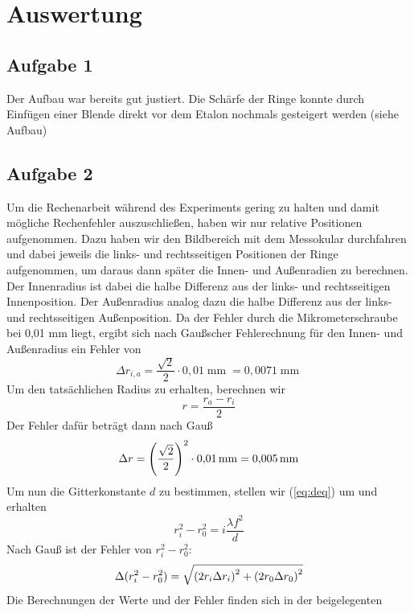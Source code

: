 \documentclass[a4paper,german,12pt,smallheadings]{scrartcl}
\begin{document}
\section{Auswertung}
\subsection{Aufgabe 1}
Der Aufbau war bereits gut justiert. Die Schärfe der Ringe konnte durch
Einfügen einer Blende direkt vor dem Etalon nochmals gesteigert werden (siehe
Aufbau)
\subsection{Aufgabe 2}
Um die Rechenarbeit während des Experiments gering zu halten und damit mögliche
Rechenfehler auszuschließen, haben wir nur relative Positionen aufgenommen.
Dazu haben wir den Bildbereich mit dem Messokular durchfahren und dabei jeweils
die links- und rechtsseitigen Positionen der Ringe aufgenommen, um daraus dann
später die Innen- und Außenradien zu berechnen.
Der Innenradius ist dabei die halbe Differenz aus der links- und rechtsseitigen
Innenposition. Der Außenradius analog dazu die halbe Differenz aus der links-
und rechtsseitigen Außenposition. Da der Fehler durch die Mikrometerschraube
bei 0{,}01 mm liegt, ergibt sich nach Gaußscher Fehlerechnung für den Innen-
und Außenradius ein Fehler von
\begin{equation}
\Delta r_{i,a} = \frac{\sqrt{2}}{2} \cdot 0{,}01 \operatorname{mm} = 0{,}0071
\operatorname{mm}
\end{equation}
Um den tatsächlichen Radius zu erhalten, berechnen wir
\begin{equation}
r = \frac{r_a - r_i}{2}
\end{equation}
Der Fehler dafür beträgt dann nach Gauß
\begin{equation}
\Delta r = \del{\frac{\sqrt{2}}{2}}^2 \cdot 0{,}01 \operatorname{mm} = 0{,}005 \operatorname{mm}
\end{equation}
Um nun die Gitterkonstante $d$ zu bestimmen, stellen wir (\ref{eq:deq}) um und erhalten
\begin{equation}
r_i^2 - r_0^2 = i \frac{\lambda f^2}{d}
\end{equation}
Nach Gauß ist der Fehler von $r_i^2 - r_0^2$:
\begin{align*}
\Delta(r_i^2 - r_0^2) = \sqrt{\del{2 r_i \Delta r_i}^2 + \del{2 r_0 \Delta r_0}^2}
\end{align*}
Die Berechnungen der Werte und der Fehler finden sich in der beigelegenten
\end{document}
